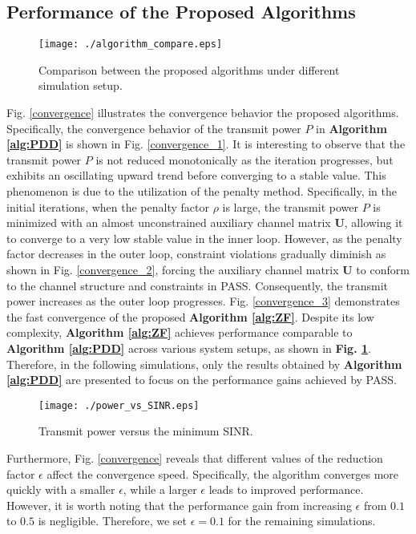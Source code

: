 \subsection{Performance of the Proposed Algorithms}



\begin{figure}[t!]
  \centering
  \texttt{[image: ./algorithm\_compare.eps]}
  \caption{Comparison between the proposed algorithms under different simulation setup.}
  \label{power_algorithm_compare}
\end{figure} 


Fig. \ref{convergence} illustrates the convergence behavior the proposed algorithms.  Specifically, the convergence behavior of the transmit power $P$ in \textbf{Algorithm \ref{alg:PDD}} is shown in Fig. \ref{convergence_1}. It is interesting to observe that the transmit power $P$ is not reduced monotonically as the iteration progresses, but exhibits an oscillating upward trend before converging to a stable value. This phenomenon is due to the utilization of the penalty method. Specifically, in the initial iterations, when the penalty factor $\rho$ is large, the transmit power $P$ is minimized with an almost unconstrained auxiliary channel matrix $\mathbf{U}$, allowing it to converge to a very low stable value in the inner loop. However, as the penalty factor decreases in the outer loop, constraint violations gradually diminish as shown in Fig. \ref{convergence_2}, forcing the auxiliary channel matrix $\mathbf{U}$ to conform to the channel structure and constraints in PASS. Consequently, the transmit power increases as the outer loop progresses. Fig. \ref{convergence_3} demonstrates the fast convergence of the proposed \textbf{Algorithm \ref{alg:ZF}}. Despite its low complexity, \textbf{Algorithm \ref{alg:ZF}} achieves performance comparable to \textbf{Algorithm \ref{alg:PDD}} across various system setups, as shown in \textbf{Fig. \ref{power_algorithm_compare}}. Therefore, in the following simulations, only the results obtained by \textbf{Algorithm \ref{alg:PDD}} are presented to focus on the performance gains achieved by PASS.

\begin{figure}[t!]
  \centering
  \texttt{[image: ./power\_vs\_SINR.eps]}
  \caption{Transmit power versus the minimum SINR.}
  \label{power_vs_SINR}
\end{figure} 

Furthermore, Fig. \ref{convergence} reveals that different values of the reduction factor $\epsilon$ affect the convergence speed. Specifically, the algorithm converges more quickly with a smaller $\epsilon$, while a larger $\epsilon$ leads to improved performance. However, it is worth noting that the performance gain from increasing $\epsilon$ from $0.1$ to $0.5$ is negligible. Therefore, we set $\epsilon = 0.1$ for the remaining simulations.

